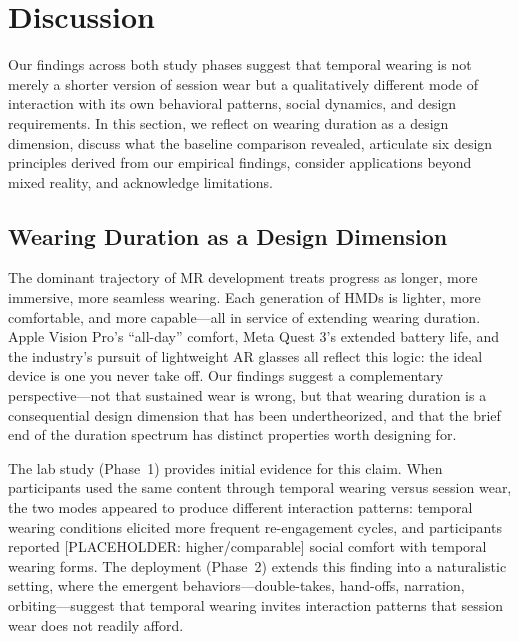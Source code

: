 
\section{Discussion}

Our findings across both study phases suggest that temporal wearing is not merely a shorter version of session wear but a qualitatively different mode of interaction with its own behavioral patterns, social dynamics, and design requirements. In this section, we reflect on wearing duration as a design dimension, discuss what the baseline comparison revealed, articulate six design principles derived from our empirical findings, consider applications beyond mixed reality, and acknowledge limitations.

\subsection{Wearing Duration as a Design Dimension}

The dominant trajectory of MR development treats progress as longer, more immersive, more seamless wearing. Each generation of HMDs is lighter, more comfortable, and more capable---all in service of extending wearing duration. Apple Vision Pro's ``all-day'' comfort, Meta Quest 3's extended battery life, and the industry's pursuit of lightweight AR glasses all reflect this logic: the ideal device is one you never take off. Our findings suggest a complementary perspective---not that sustained wear is wrong, but that wearing duration is a consequential design dimension that has been undertheorized, and that the brief end of the duration spectrum has distinct properties worth designing for.

The lab study (Phase~1) provides initial evidence for this claim. When participants used the same content through temporal wearing versus session wear, the two modes appeared to produce different interaction patterns: temporal wearing conditions elicited more frequent re-engagement cycles, and participants reported [PLACEHOLDER: higher/comparable] social comfort with temporal wearing forms. The deployment (Phase~2) extends this finding into a naturalistic setting, where the emergent behaviors---double-takes, hand-offs, narration, orbiting---suggest that temporal wearing invites interaction patterns that session wear does not readily afford.

